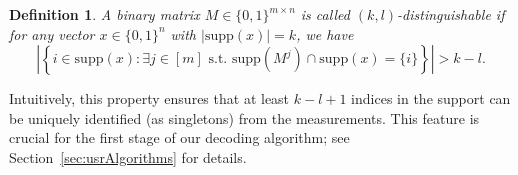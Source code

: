\documentclass{article}
\newtheorem{definition}{Definition}[subsection]
\newcommand{\supp}{\mathrm{supp}}
\begin{document}
\begin{definition}\label{def:kld}
A binary matrix $M \in \{0,1\}^{m \times n}$ is called $(k,l)$-\emph{distinguishable} if for any vector $x \in \{0,1\}^n$ with $|\supp(x)| = k$, we have
\[
\left| \left\{ i \in \supp(x) : \exists j \in [m] \text{ s.t. } \supp(M^j) \cap \supp(x) = \{i\} \right\} \right| > k - l.
\]


\end{definition}

Intuitively, this property ensures that at least $k - l + 1$ indices in the support can be uniquely identified (as singletons) from the measurements. This feature is crucial for the first stage of our decoding algorithm; see Section~\ref{sec:usrAlgorithms} for details. 
\end{document}

